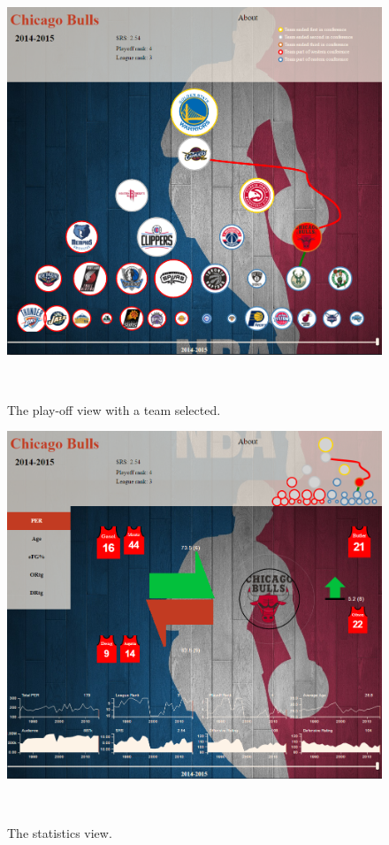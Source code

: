 \documentclass{sigchi}
\begin{document}
\begin{figure}
\centering
  \includegraphics[width=0.9\columnwidth]{figures/playoffviewteamselected}
  \caption{The play-off view with a team selected.}~\label{fig:playoffviewteam}
\end{figure}

\begin{figure}
\centering
  \includegraphics[width=0.9\columnwidth]{figures/statisticsview}
  \caption{The statistics view.}~\label{fig:statisticsview}
\end{figure}
\end{document}
